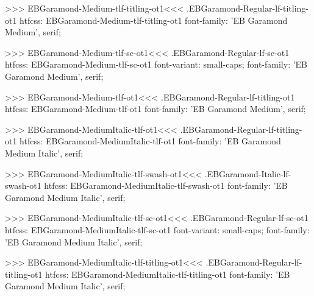 {{{{{{{>>>
\<EBGaramond-Medium-tlf-titling-ot1\><<<
.EBGaramond-Regular-lf-titling-ot1
htfcss:  EBGaramond-Medium-tlf-titling-ot1  font-family: 'EB Garamond Medium', serif;

>>>
\<EBGaramond-Medium-tlf-sc-ot1\><<<
.EBGaramond-Regular-lf-sc-ot1
htfcss:  EBGaramond-Medium-tlf-sc-ot1  font-variant: small-caps; font-family: 'EB Garamond Medium', serif;

>>>
\<EBGaramond-Medium-tlf-ot1\><<<
.EBGaramond-Regular-lf-titling-ot1
htfcss:  EBGaramond-Medium-tlf-ot1  font-family: 'EB Garamond Medium', serif;

>>>
\<EBGaramond-MediumItalic-tlf-ot1\><<<
.EBGaramond-Regular-lf-titling-ot1
htfcss:  EBGaramond-MediumItalic-tlf-ot1  font-family: 'EB Garamond Medium Italic', serif;

>>>
\<EBGaramond-MediumItalic-tlf-swash-ot1\><<<
.EBGaramond-Italic-lf-swash-ot1
htfcss:  EBGaramond-MediumItalic-tlf-swash-ot1  font-family: 'EB Garamond Medium Italic', serif;

>>>
\<EBGaramond-MediumItalic-tlf-sc-ot1\><<<
.EBGaramond-Regular-lf-sc-ot1
htfcss:  EBGaramond-MediumItalic-tlf-sc-ot1  font-variant: small-caps; font-family: 'EB Garamond Medium Italic', serif;

>>>
\<EBGaramond-MediumItalic-tlf-titling-ot1\><<<
.EBGaramond-Regular-lf-titling-ot1
htfcss:  EBGaramond-MediumItalic-tlf-titling-ot1  font-family: 'EB Garamond Medium Italic', serif;

}}}}}}}
